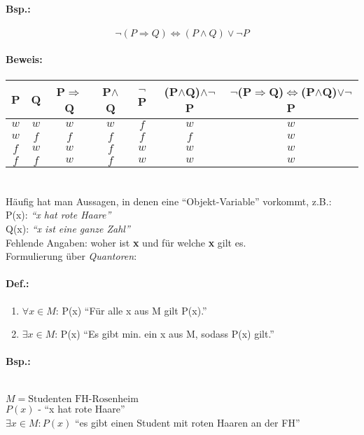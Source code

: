 \documentclass[11pt,a4paper,oneside]{article}
\begin{document}
{\paragraph{Bsp.:}
  \[\neg(P \Rightarrow Q) \Leftrightarrow (P \land Q) \lor \neg P\]

\paragraph{Beweis:}
  \begin{center}
    \begin{tabular}{c | c | c | c | c | c | c}
      P & Q & P$\Rightarrow$Q & P$\land$Q & $\neg$P & (P$\land$Q)$\land\neg$P & $\neg$(P$\Rightarrow$Q)$\Leftrightarrow$(P$\land$Q)$\lor\neg$P \\
      \hline
      $w$ & $w$ & $w$ & $w$ & $f$ & $w$ & $w$ \\
      $w$ & $f$ & $f$ & $f$ & $f$ & $f$ & $w$ \\
      $f$ & $w$ & $w$ & $f$ & $w$ & $w$ & $w$ \\
      $f$ & $f$ & $w$ & $f$ & $w$ & $w$ & $w$ \\
    \end{tabular}
  \end{center}

\paragraph{}\mbox{}\\
  Häufig hat man Aussagen, in denen eine ``Objekt-Variable'' vorkommt, z.B.:\\
  P(x): \emph{``x hat rote Haare''}\\
  Q(x): \emph{``x ist eine ganze Zahl''}\\
  Fehlende Angaben: woher ist \textbf{x} und für welche \textbf{x} gilt es.\\[8pt]
  Formulierung über \emph{Quantoren}:

\paragraph{Def.:}
  \begin{enumerate}
    \item $\forall x \in M$: P(x) ``Für alle x aus M gilt P(x).''
    \item $\exists x \in M$: P(x) ``Es gibt min. ein x aus M, sodass P(x) gilt.''
  \end{enumerate}

\paragraph{Bsp.:}\mbox{}\\
  $M = \text{Studenten FH-Rosenheim}$\\
  $P(x)$ - ``x hat rote Haare''\\
  $\exists x \in M: P(x)$ ``es gibt einen Student mit roten Haaren an der FH''

}
\end{document}
